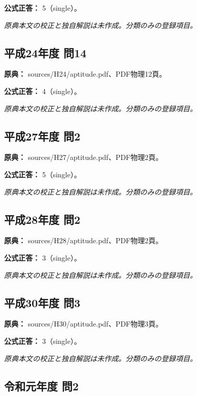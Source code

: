 \textbf{公式正答：} 5（single）。

\par\textit{原典本文の校正と独自解説は未作成。分類のみの登録項目。}

\subsection{平成24年度 問14}
\label{q:h24-reg-apt-14}

\noindent\textbf{原典：} sources/H24/aptitude.pdf、PDF物理12頁。

\textbf{公式正答：} 4（single）。

\par\textit{原典本文の校正と独自解説は未作成。分類のみの登録項目。}

\subsection{平成27年度 問2}
\label{q:h27-reg-apt-02}

\noindent\textbf{原典：} sources/H27/aptitude.pdf、PDF物理2頁。

\textbf{公式正答：} 5（single）。

\par\textit{原典本文の校正と独自解説は未作成。分類のみの登録項目。}

\subsection{平成28年度 問2}
\label{q:h28-reg-apt-02}

\noindent\textbf{原典：} sources/H28/aptitude.pdf、PDF物理2頁。

\textbf{公式正答：} 3（single）。

\par\textit{原典本文の校正と独自解説は未作成。分類のみの登録項目。}

\subsection{平成30年度 問3}
\label{q:h30-reg-apt-03}

\noindent\textbf{原典：} sources/H30/aptitude.pdf、PDF物理3頁。

\textbf{公式正答：} 3（single）。

\par\textit{原典本文の校正と独自解説は未作成。分類のみの登録項目。}

\subsection{令和元年度 問2}
\label{q:r01-reg-apt-02}


